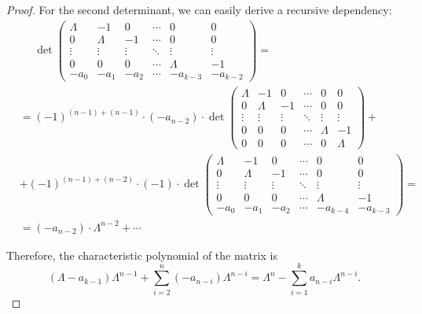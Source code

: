 \begin{proof}
  For the second determinant, we can easily derive a recursive dependency:
  \begin{align*}
    &\phantom{{}={}}
    \det \begin{pmatrix}
      \Lambda & -1      & 0       & \cdots & 0        & 0      \\
      0       & \Lambda & -1      & \cdots & 0        & 0      \\
      \vdots  & \vdots  & \vdots  & \ddots & \vdots   & \vdots \\
      0       & 0       & 0       & \cdots & \Lambda  & -1     \\
      -a_0    & -a_1    & -a_2    & \cdots & -a_{k-3} & -a_{k-2}
    \end{pmatrix}
    = \\ &=
    (-1)^{(n-1)+(n-1)} \cdot (-a_{n-2}) \cdot
    \det \begin{pmatrix}
      \Lambda & -1      & 0       & \cdots & 0       & 0      \\
      0       & \Lambda & -1      & \cdots & 0       & 0      \\
      \vdots  & \vdots  & \vdots  & \ddots & \vdots  & \vdots \\
      0       & 0       & 0       & \cdots & \Lambda & -1     \\
      0       & 0       & 0       & \cdots & 0       & \Lambda
    \end{pmatrix}
    + \\ &+
    (-1)^{(n-1)+(n-2)} \cdot (-1) \cdot
    \det \begin{pmatrix}
      \Lambda & -1      & 0       & \cdots & 0        & 0      \\
      0       & \Lambda & -1      & \cdots & 0        & 0      \\
      \vdots  & \vdots  & \vdots  & \ddots & \vdots   & \vdots \\
      0       & 0       & 0       & \cdots & \Lambda  & -1     \\
      -a_0    & -a_1    & -a_2    & \cdots & -a_{k-4} & -a_{k-3}
    \end{pmatrix}
    = \\ &=
    (-a_{n-2}) \cdot \Lambda^{n-2} + \cdots
  \end{align*}

  Therefore, the characteristic polynomial of the matrix is
  \begin{equation*}
    (\Lambda - a_{k-1}) \Lambda^{n-1} + \sum_{i=2}^n (-a_{n-i}) \Lambda^{n-i}
    =
    \Lambda^n - \sum_{i=1}^k a_{n-i} \Lambda^{n-i}.
  \end{equation*}
\end{proof}

